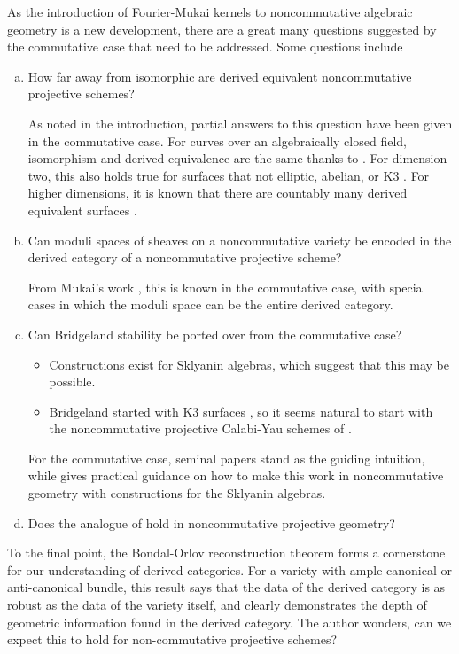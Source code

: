 \documentclass[11pt]{article}
\begin{document}
As the introduction of Fourier-Mukai kernels to noncommutative algebraic geometry is a new development, there are a great many questions suggested by the commutative case that need to be addressed.
Some questions include
\begin{enumerate}[(a)]
\item
  How far away from isomorphic are derived equivalent noncommutative projective schemes?

  As noted in the introduction, partial answers to this question have been given in the commutative case.
  For curves over an algebraically closed field, isomorphism and derived equivalence are the same thanks to \cite{Orlov1997}.
  For dimension two, this also holds true for surfaces that not elliptic, abelian, or K3 \cite[Prop. 12.1]{HuyFMT}.
  For higher dimensions, it is known that there are countably many derived equivalent surfaces \cite{AnToe}.
\item
  Can moduli spaces of sheaves on a noncommutative variety be encoded in the derived category of a noncommutative projective scheme?

  From Mukai's work \cite{Mukai81,Mukai87}, this is known in the commutative case, with special cases in which the moduli space can be the entire derived category.
\item
  Can Bridgeland stability be ported over from the commutative case?
  \begin{itemize}
  \item
    Constructions exist for Sklyanin algebras, which suggest that this may be possible.
  \item
    Bridgeland started with K3 surfaces \cite{Bri07,Bri08}, so it seems natural to start with the noncommutative projective Calabi-Yau schemes of \cite{kanazawa2015}.
  \end{itemize}

  For the commutative case, seminal papers \cite{Bri07, ABCH13, BM14a, BM14b} stand as the guiding intuition, while \cite{LiZhMMP} gives practical guidance on how to make this work in noncommutative geometry with constructions for the Sklyanin algebras.
    \item
    Does the analogue of \cite{Bondal-Orlov} hold in noncommutative projective geometry?
\end{enumerate}
To the final point, the Bondal-Orlov reconstruction theorem forms a cornerstone for our understanding of derived categories.
For a variety with ample canonical or anti-canonical bundle, this result says that the data of the derived category is as robust as the data of the variety itself, and clearly demonstrates the depth of geometric information found in the derived category.
The author wonders, can we expect this to hold for non-commutative projective schemes?
\end{document}

